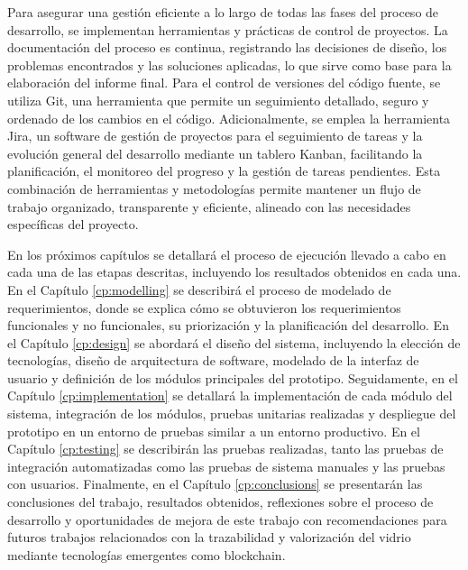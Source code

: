 Para asegurar una gestión eficiente a lo largo de todas las fases del proceso de desarrollo, se implementan herramientas y prácticas de control de proyectos. La documentación del proceso es continua, registrando las decisiones de diseño, los problemas encontrados y las soluciones aplicadas, lo que sirve como base para la elaboración del informe final. Para el control de versiones del código fuente, se utiliza Git, una herramienta que permite un seguimiento detallado, seguro y ordenado de los cambios en el código. Adicionalmente, se emplea la herramienta Jira, un software de gestión de proyectos para el seguimiento de tareas y la evolución general del desarrollo mediante un tablero Kanban, facilitando la planificación, el monitoreo del progreso y la gestión de tareas pendientes. Esta combinación de herramientas y metodologías permite mantener un flujo de trabajo organizado, transparente y eficiente, alineado con las necesidades específicas del proyecto.




En los próximos capítulos se detallará el proceso de ejecución llevado a cabo en cada una de las etapas descritas, incluyendo los resultados obtenidos en cada una.
En el Capítulo \ref{cp:modelling} se describirá el proceso de modelado de requerimientos, donde se explica cómo se obtuvieron los requerimientos funcionales y no funcionales, su priorización y la planificación del desarrollo.
En el Capítulo \ref{cp:design} se abordará el diseño del sistema, incluyendo la elección de tecnologías, diseño de arquitectura de software, modelado de la interfaz de usuario y definición de los módulos principales del prototipo.
Seguidamente, en el Capítulo \ref{cp:implementation} se detallará la implementación de cada módulo del sistema, integración de los módulos, pruebas unitarias realizadas y despliegue del prototipo en un entorno de pruebas similar a un entorno productivo.
En el Capítulo \ref{cp:testing} se describirán las pruebas realizadas, tanto las pruebas de integración automatizadas como las pruebas de sistema manuales y las pruebas con usuarios.
Finalmente, en el Capítulo \ref{cp:conclusions} se presentarán las conclusiones del trabajo, resultados obtenidos, reflexiones sobre el proceso de desarrollo y oportunidades de mejora de este trabajo con recomendaciones para futuros trabajos relacionados con la trazabilidad y valorización del vidrio mediante tecnologías emergentes como blockchain.

